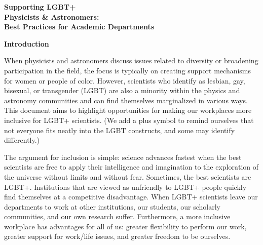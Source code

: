 \begin{titlepage}
\setcounter{page}{3}
\begin{center}

{\Large{\textbf{Supporting LGBT+ \\Physicists \& Astronomers:\\ Best Practices for Academic Departments}}}
\vspace*{\baselineskip}

{\large{\textbf{Introduction}}}
\vspace*{\baselineskip}
\end{center}

When physicists and astronomers discuss issues related to diversity or broadening participation in the field, the focus is typically on creating support mechanisms for women or people of color.  However, scientists who identify as lesbian, gay, bisexual, or transgender (LGBT) are also a minority within the physics and astronomy communities and can find themselves marginalized in various ways.  This document aims to highlight opportunities for making our workplaces more inclusive for LGBT+ scientists.  (We add a plus symbol to remind ourselves that not everyone fits neatly into the LGBT constructs, and some may identify differently.)\vspace*{\baselineskip}

The argument for inclusion is simple: science advances fastest when the best scientists are free to apply their intelligence and imagination to the exploration of the universe without limits and without fear.  Sometimes, the best scientists are LGBT+.  Institutions that are viewed as unfriendly to LGBT+ people quickly find themselves at a competitive disadvantage.  When LGBT+ scientists leave our departments to work at other institutions, our students, our scholarly communities, and our own research suffer.  Furthermore, a more inclusive workplace has advantages for all of us: greater flexibility to perform our work, greater support for work/life issues, and greater freedom to be ourselves. \vspace*{\baselineskip}


\end{titlepage}
